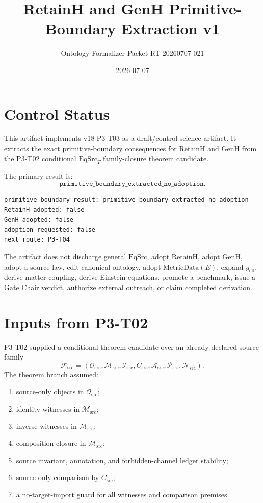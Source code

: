 \documentclass[11pt]{article}
\title{RetainH and GenH Primitive-Boundary Extraction v1}
\author{Ontology Formalizer Packet RT-20260707-021}
\date{2026-07-07}
\newcommand{\EqSrc}{\mathrm{EqSrc}}
\newcommand{\EqSrcT}{\mathrm{EqSrc}_{T}}
\newcommand{\RetainH}{\mathrm{RetainH}}
\newcommand{\GenH}{\mathrm{GenH}}
\newcommand{\Fsrc}{\mathcal{F}_{\mathrm{src}}}
\newcommand{\Osrc}{\mathcal{O}_{\mathrm{src}}}
\newcommand{\Msrc}{\mathcal{M}_{\mathrm{src}}}
\newcommand{\Isrc}{\mathcal{I}_{\mathrm{src}}}
\newcommand{\Asrc}{\mathcal{A}_{\mathrm{src}}}
\newcommand{\Psrc}{\mathcal{P}_{\mathrm{src}}}
\newcommand{\Nsrc}{\mathcal{N}_{\mathrm{src}}}
\newcommand{\Csrc}{C_{\mathrm{src}}}
\begin{document}
\maketitle

\section{Control Status}

This artifact implements v18 P3-T03 as a draft/control science artifact. It
extracts the exact primitive-boundary consequences for \(\RetainH\) and
\(\GenH\) from the P3-T02 conditional \(\EqSrcT\) family-closure theorem
candidate.

The primary result is:
\[
  \texttt{primitive\_boundary\_extracted\_no\_adoption}.
\]

\begin{verbatim}
primitive_boundary_result: primitive_boundary_extracted_no_adoption
RetainH_adopted: false
GenH_adopted: false
adoption_requested: false
next_route: P3-T04
\end{verbatim}

The artifact does not discharge general \(\EqSrc\), adopt \(\RetainH\), adopt
\(\GenH\), adopt a source law, edit canonical ontology, adopt
\(\mathrm{MetricData}(E)\), expand \(g_{\mathrm{eff}}\), derive matter
coupling, derive Einstein equations, promote a benchmark, issue a Gate Chair
verdict, authorize external outreach, or claim completed derivation.

\section{Inputs from P3-T02}

P3-T02 supplied a conditional theorem candidate over an already-declared source
family
\[
  \Fsrc=(\Osrc,\Msrc,\Isrc,\Csrc,\Asrc,\Psrc,\Nsrc).
\]
The theorem branch assumed:
\begin{enumerate}[label=(H\arabic*)]
  \item source-only objects in \(\Osrc\);
  \item identity witnesses in \(\Msrc\);
  \item inverse witnesses in \(\Msrc\);
  \item composition closure in \(\Msrc\);
  \item source invariant, annotation, and forbidden-channel ledger stability;
  \item source-only comparison by \(\Csrc\);
  \item a no-target-import guard for all witnesses and comparison premises.
\end{enumerate}
\end{document}
